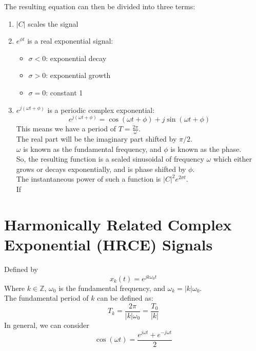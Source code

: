 \documentclass[nobib]{tufte-handout}
\begin{document}
\begin{enumerate}[start = 3]
    The resulting equation can then be divided into three terms:
    \begin{enumerate}
        \item $|C|$ scales the signal
        \item $e^{\phi t}$ is a real exponential signal:
        \begin{itemize}
            \item $\sigma < 0$: exponential decay
            \item $\sigma > 0$: exponential growth
            \item $\sigma = 0$: constant 1
        \end{itemize}
        \item $e^{j(\omega t + \phi)}$ is a periodic complex exponential:
        \begin{equation*}
            e^{j(\omega t + \phi)} = \cos(\omega t +\phi)+j\sin(\omega t + \phi)
        \end{equation*}
        This means we have a period of $T = \frac{2\pi}{\omega}$.\\
        The real part will be the imaginary part shifted by $\pi/2$.\\
        $\omega$ is known as the fundamental frequency, and $\phi$ is known as the phase.\\
        So, the resulting function is a scaled sinusoidal of frequency $\omega$ which either grows or decays exponentially, and is phase shifted by $\phi$.\\
        The instantaneous power of such a function is $|C|^2e^{2\sigma t}$.\\
        If 
    \end{enumerate}
\end{enumerate}
\section{Harmonically Related Complex Exponential (HRCE) Signals}
Defined by
\begin{equation*}
    x_k(t) = e^{jk\omega_0 t}
\end{equation*}
Where $k \in \mathbb{Z}$, $\omega_0$ is the fundamental frequency, and $\omega_k=|k|\omega_0$.\\
The fundamental period of $k$ can be defined as:
\begin{equation*}
    T_k = \frac{2\pi}{|k|\omega_0} = \frac{T_0}{|k|}
\end{equation*}
In general, we can consider
\begin{equation*}
    \cos(\omega t) = \frac{e^{j\omega t}+e^{-j\omega t}}{2}
\end{equation*}
\end{document}
